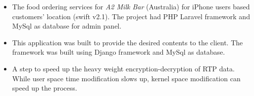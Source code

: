 \begin{itemize}
    \item The food ordering services for \textit{A2 Milk Bar} (Australia) for iPhone users based customers’ location (swift v2.1). The project had PHP Laravel framework and MySql as database for admin panel.
\end{itemize}

\begin{itemize}
    \item This application was built to provide the desired contents to the client.
    The framework was built using Django framework and MySql as database.
\end{itemize}

\begin{itemize}
    \item A step to speed up the heavy weight encryption-decryption of RTP data.
    While user space time modification slows up, kernel space modification can speed up the process.
\end{itemize}



